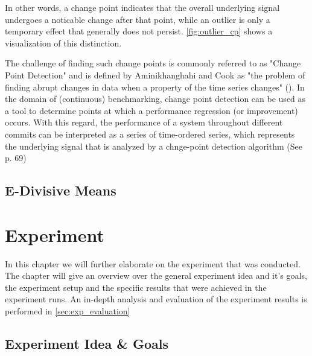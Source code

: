 \documentclass[	runningheads,
				a4paper]{llncs}
\begin{document}
	In other words, a change point indicates that the overall underlying signal undergoes a noticable change after that point, while an outlier is only a temporary effect that generally does not persist. \autoref{fig:outlier_cp} shows a visualization of this distinction.

	The challenge of finding such change points is commonly referred to as "Change Point Detection" and is defined by Aminikhanghahi and Cook as "the problem of finding abrupt changes in data when a property of the time series changes" (\cite{Samaneh2016}). In the domain of (continuous) benchmarking, change point detection can be used as a tool to determine points at which a performance regression (or improvement) occurs. With this regard, the performance of a system throughout different commits can be interpreted as a series of time-ordered series, which represents the underlying signal that is analyzed by a chnge-point detection algorithm (See \cite{daly2020} p. 69)

	\subsection{E-Divisive Means}
	\label{ssec:cp_edivisive}

\section{Experiment}
In this chapter we will further elaborate on the experiment that was conducted. The chapter will give an overview over the general experiment idea and it's goals, the experiment setup and the specific results that were achieved in the experiment runs. An in-depth analysis and evaluation of the experiment results is performed in \autoref{sec:exp_evaluation}

	\subsection{Experiment Idea \& Goals}
	\label{ssec:exp_goals}
\end{document}

